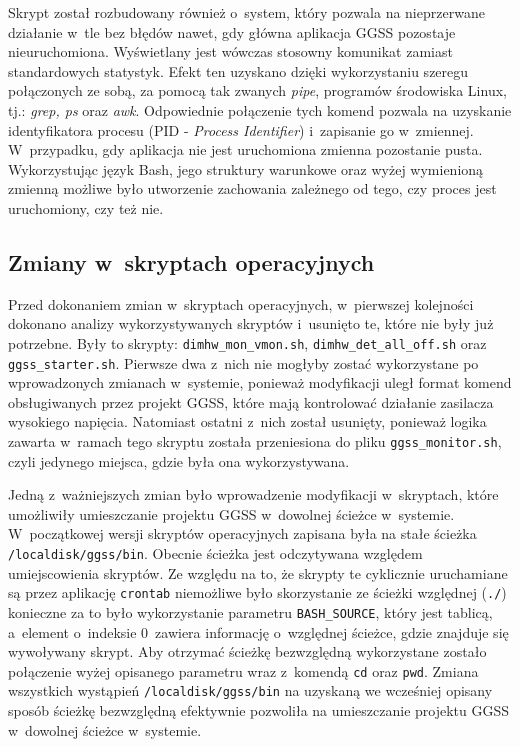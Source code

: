 Skrypt został rozbudowany również o~system, który pozwala na nieprzerwane działanie w~tle bez błędów nawet, gdy główna aplikacja GGSS pozostaje nieuruchomiona. Wyświetlany jest wówczas stosowny komunikat zamiast standardowych statystyk. Efekt ten uzyskano dzięki wykorzystaniu szeregu połączonych ze sobą, za pomocą tak zwanych \emph{pipe}, programów środowiska Linux, tj.: \emph{grep, ps} \cite{man} oraz \emph{awk}. Odpowiednie połączenie tych komend pozwala na uzyskanie identyfikatora procesu (PID - \emph{Process Identifier}) i~zapisanie go w~zmiennej. W~przypadku, gdy aplikacja nie jest uruchomiona zmienna pozostanie pusta. Wykorzystując język Bash, jego struktury warunkowe oraz wyżej wymienioną zmienną możliwe było utworzenie zachowania zależnego od tego, czy proces jest uruchomiony, czy też nie.

\subsection{Zmiany w~skryptach operacyjnych}
Przed dokonaniem zmian w~skryptach operacyjnych, w~pierwszej kolejności dokonano analizy wykorzystywanych skryptów i~usunięto te, które nie były już potrzebne. Były to skrypty: \lstinline{dimhw_mon_vmon.sh}, \lstinline{dimhw_det_all_off.sh} oraz \lstinline{ggss_starter.sh}. Pierwsze dwa z~nich nie mogłyby zostać wykorzystane po wprowadzonych zmianach w~systemie, ponieważ modyfikacji uległ format komend obsługiwanych przez projekt GGSS, które mają kontrolować działanie zasilacza wysokiego napięcia. Natomiast ostatni z~nich został usunięty, ponieważ logika zawarta w~ramach tego skryptu została przeniesiona do pliku \lstinline{ggss_monitor.sh}, czyli jedynego miejsca, gdzie była ona wykorzystywana.

Jedną z~ważniejszych zmian było wprowadzenie modyfikacji w~skryptach, które umożliwiły umieszczanie projektu GGSS w~dowolnej ścieżce w~systemie. W~początkowej wersji skryptów operacyjnych zapisana była na stałe ścieżka \lstinline{/localdisk/ggss/bin}. Obecnie ścieżka jest odczytywana względem umiejscowienia skryptów. Ze względu na to, że skrypty te cyklicznie uruchamiane są przez aplikację \lstinline{crontab} niemożliwe było skorzystanie ze ścieżki względnej (\lstinline{./}) konieczne za to było wykorzystanie parametru \lstinline{BASH_SOURCE}, który jest tablicą, a~element o~indeksie 0~zawiera informację o~względnej ścieżce, gdzie znajduje się wywoływany skrypt. Aby otrzymać ścieżkę bezwzględną wykorzystane zostało połączenie wyżej opisanego parametru wraz z~komendą \lstinline{cd} oraz \lstinline{pwd}. Zmiana wszystkich wystąpień \lstinline{/localdisk/ggss/bin} na uzyskaną we wcześniej opisany sposób ścieżkę bezwzględną efektywnie pozwoliła na umieszczanie projektu GGSS w~dowolnej ścieżce w~systemie.

